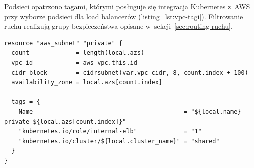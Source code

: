 Podsieci opatrzono tagami, którymi posługuje się integracja Kubernetes z~AWS przy wyborze podsieci dla load
balancerów (listing~\ref{lst:vpc-tagi}). Filtrowanie ruchu realizują grupy bezpieczeństwa opisane
w~sekcji~\ref{sec:routing-ruchu}.

\begin{lstlisting}[caption={Definicja podsieci prywatnych z tagami Kubernetes (vpc.tf)},label={lst:vpc-tagi}]
resource "aws_subnet" "private" {
  count             = length(local.azs)
  vpc_id            = aws_vpc.this.id
  cidr_block        = cidrsubnet(var.vpc_cidr, 8, count.index + 100)
  availability_zone = local.azs[count.index]

  tags = {
    Name                                          = "${local.name}-private-${local.azs[count.index]}"
    "kubernetes.io/role/internal-elb"             = "1"
    "kubernetes.io/cluster/${local.cluster_name}" = "shared"
  }
}
\end{lstlisting}

